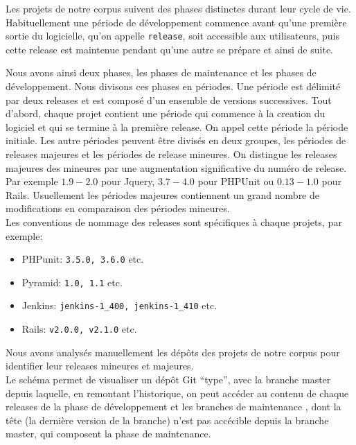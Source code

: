 Les projets de notre corpus suivent des phases distinctes durant leur cycle de vie. Habituellement une période de développement commence avant qu'une première sortie du logicielle, qu'on appelle \texttt{release}, soit accessible aux utilisateurs, puis cette release est maintenue pendant qu'une autre se prépare et ainsi de suite.

Nous avons ainsi deux phases, les phases de maintenance et les phases de développement. Nous divisons ces phases en périodes. Une période est délimité par deux releases et est composé d'un ensemble de versions successives. Tout d'abord, chaque projet contient une période qui commence à la creation du logiciel et qui se termine à la première release. On appel cette période la période initiale. Les autre périodes peuvent être divisés en deux groupes, les périodes de releases majeures et les périodes de release mineures. On distingue les releases majeures des mineures par une augmentation significative du numéro de release. Par exemple $1.9-2.0$ pour Jquery, $3.7-4.0$ pour PHPUnit ou $0.13-1.0$ pour Rails. Usuellement les périodes majeures contiennent un grand nombre de modifications en comparaison des périodes mineures.\\

Les conventions de nommage des releases sont spécifiques à chaque projets, par exemple:
\begin{itemize}
\item PHPunit: \texttt{3.5.0, 3.6.0} etc.
\item Pyramid: \texttt{1.0, 1.1} etc.
\item Jenkins: \texttt{jenkins-1\_400, jenkins-1\_410} etc.
\item Rails: \texttt{v2.0.0, v2.1.0} etc.
\end{itemize}
Nous avons analysés manuellement les dépôts des projets de notre corpus pour identifier leur releases mineures et majeures.\\

Le schéma  permet de visualiser un dépôt Git ``type'', avec la branche master depuis laquelle, en remontant l'historique, on peut accéder au contenu de chaque releases de la phase de développement et les branches de maintenance , dont la tête (la dernière version de la branche) n'est pas accécible depuis la branche master, qui composent la phase de maintenance.

